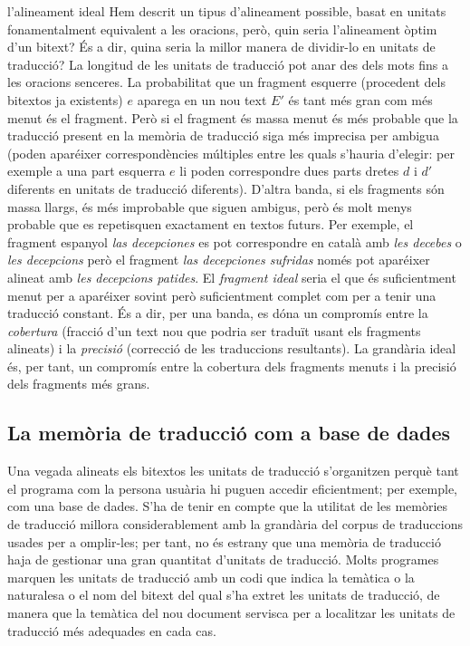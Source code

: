 \begin{persabermes}{l'alineament ideal}
  Hem descrit un tipus d'alineament possible, basat en unitats fonamentalment equivalent a les oracions, però, quin seria l'alineament òptim d'un bitext? És a dir, quina seria la millor manera de
  dividir-lo en unitats de traducció?  La longitud de les unitats de
  traducció pot anar des dels mots fins a les oracions senceres. La
  probabilitat que un fragment esquerre (procedent dels bitextos ja
  existents) $e$ aparega en un nou text $E'$ és tant més gran com més
  menut és el fragment. Però si el fragment és massa menut és més
  probable que la traducció present en la memòria de traducció siga
  més imprecisa per ambigua (poden aparéixer correspondències
  múltiples entre les quals s'hauria d'elegir: per exemple a una part
  esquerra $e$ li poden correspondre dues parts dretes $d$ i $d'$
  diferents en unitats de traducció diferents).  D'altra banda, si els
  fragments són massa llargs, és més improbable que siguen ambigus,
  però és molt menys probable que es repetisquen exactament en textos
  futurs. Per exemple, el fragment espanyol \emph{las
      decepciones} es pot correspondre en català amb \emph{les
      decebes} o \emph{les decepcions} però el fragment \emph{las
      decepciones sufridas} només pot aparéixer alineat amb \emph{les
      decepcions patides}. El \emph{fragment ideal} seria el que és
  suficientment menut per a aparéixer sovint però suficientment
  complet com per a tenir una traducció constant. És a dir, per una
  banda, es dóna un compromís entre la \emph{cobertura} (fracció d'un
  text nou que podria ser traduït usant els fragments alineats) i la
  \emph{precisió} (correcció de les traduccions resultants).  La
  grandària ideal és, per tant, un compromís entre la cobertura dels
  fragments menuts i la precisió dels fragments més grans.
\end{persabermes}


\subsection{La memòria de traducció com a base de dades}

Una vegada alineats els bitextos les unitats de traducció s'organitzen
perquè tant el programa com la persona usuària hi puguen accedir
eficientment; per exemple, com una base de dades. S'ha de tenir en
compte que la utilitat de les memòries de traducció millora
considerablement amb la grandària del corpus de traduccions usades per
a omplir-les; per tant, no és estrany que una memòria de traducció
haja de gestionar una gran quantitat d'unitats de traducció. Molts
programes marquen les unitats de traducció amb un codi que indica la
temàtica o la naturalesa o el nom del bitext del qual s'ha extret les
unitats de traducció, de manera que la temàtica del nou document
servisca per a localitzar les unitats de traducció més adequades en
cada cas.

